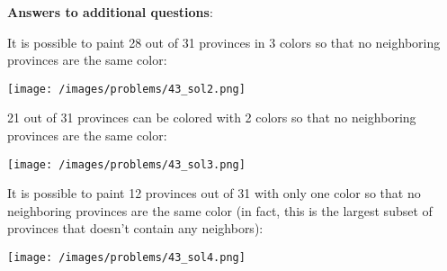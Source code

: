 \begin{solution}
\textbf{Answers to additional questions}:

It is possible to paint 28 out of 31 provinces in 3 colors so that no neighboring provinces are the same color:

\begin{center}
	\texttt{[image: /images/problems/43\_sol2.png]}
\end{center}

21 out of 31 provinces can be colored with 2 colors so that no neighboring provinces are the same color:

\begin{center}
	\texttt{[image: /images/problems/43\_sol3.png]}
\end{center}

It is possible to paint 12 provinces out of 31 with only one color so that no neighboring provinces are the same color (in fact, this is the largest subset of provinces that doesn't contain any neighbors):

\begin{center}
	\texttt{[image: /images/problems/43\_sol4.png]}
\end{center}

\end{solution}
